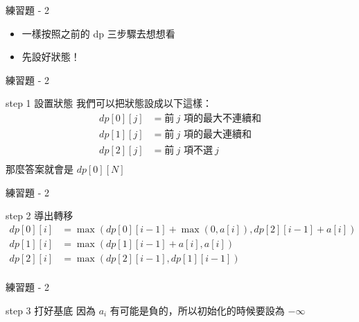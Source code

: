 \documentclass[aspectratio=169]{beamer}
\begin{document}
     \begin{frame}{練習題 - 2}
        \begin{itemize}
           \item 一樣按照之前的 dp 三步驟去想想看
           \item 先設好狀態！
        \end{itemize}
     \end{frame}

     \begin{frame}{練習題 - 2}
         \begin{alertblock}{step 1 設置狀態}
            我們可以把狀態設成以下這樣：
            \begin{align*}
                dp[0][j] &= \text{前} \ j \text{ 項的最大不連續和} \\
                dp[1][j] &= \text{前} \ j \text{ 項的最大連續和}   \\
                dp[2][j] &= \text{前} \ j \text{ 項不選} \ j       \\
            \end{align*}
            那麼答案就會是 $dp[0][N]$
        \end{alertblock}
     \end{frame}

     \begin{frame}{練習題 - 2}
        \begin{block}{step 2 導出轉移}
            \begin{align*}
                dp[0][i] &= \max(dp[0][i-1]+\max(0,a[i]),dp[2][i-1]+a[i]) \\
                dp[1][i] &= \max(dp[1][i-1]+a[i],a[i])                   \\
                dp[2][i] &= \max(dp[2][i-1],dp[1][i-1])                  \\
            \end{align*} 
        \end{block}
    \end{frame}  
    
    \begin{frame}{練習題 - 2}
        \begin{block}{step 3 打好基底}
            因為 $a_i$ 有可能是負的，所以初始化的時候要設為 $-\infty$
        \end{block}
    \end{frame}
    
\end{document}
